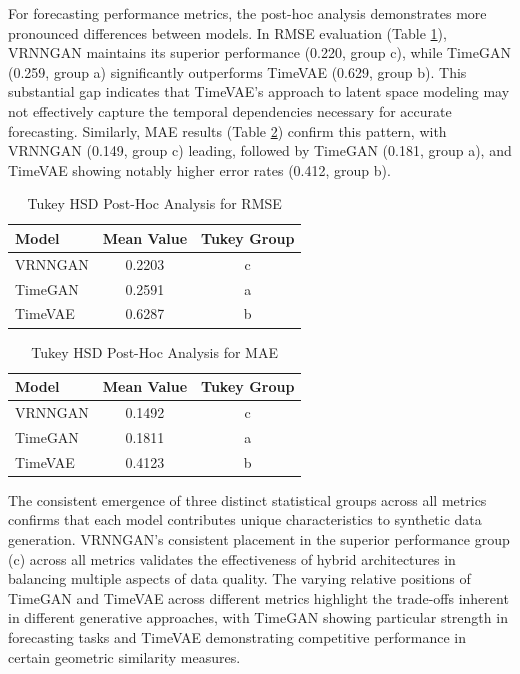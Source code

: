 \documentclass{article}
\begin{document}
For forecasting performance metrics, the post-hoc analysis demonstrates more pronounced differences between models. In RMSE evaluation (Table \ref{tab:tukey_rmse}), VRNNGAN maintains its superior performance (0.220, group c), while TimeGAN (0.259, group a) significantly outperforms TimeVAE (0.629, group b). This substantial gap indicates that TimeVAE's approach to latent space modeling may not effectively capture the temporal dependencies necessary for accurate forecasting. Similarly, MAE results (Table \ref{tab:tukey_mae}) confirm this pattern, with VRNNGAN (0.149, group c) leading, followed by TimeGAN (0.181, group a), and TimeVAE showing notably higher error rates (0.412, group b).


\begin{table}[H]
\centering
\caption{Tukey HSD Post-Hoc Analysis for RMSE}
\label{tab:tukey_rmse}
\begin{tabular}{lcc}
\toprule
\textbf{Model} & \textbf{Mean Value} & \textbf{Tukey Group} \\
\midrule
VRNNGAN & 0.2203 & c \\
TimeGAN & 0.2591 & a \\
TimeVAE & 0.6287 & b \\
\bottomrule
\end{tabular}
\footnotesize
\end{table}

\begin{table}[H]
\centering
\caption{Tukey HSD Post-Hoc Analysis for MAE}
\label{tab:tukey_mae}
\begin{tabular}{lcc}
\toprule
\textbf{Model} & \textbf{Mean Value} & \textbf{Tukey Group} \\
\midrule
VRNNGAN & 0.1492 & c \\
TimeGAN & 0.1811 & a \\
TimeVAE & 0.4123 & b \\
\bottomrule
\end{tabular}
\footnotesize
\end{table}

The consistent emergence of three distinct statistical groups across all metrics confirms that each model contributes unique characteristics to synthetic data generation. VRNNGAN's consistent placement in the superior performance group (c) across all metrics validates the effectiveness of hybrid architectures in balancing multiple aspects of data quality. The varying relative positions of TimeGAN and TimeVAE across different metrics highlight the trade-offs inherent in different generative approaches, with TimeGAN showing particular strength in forecasting tasks and TimeVAE demonstrating competitive performance in certain geometric similarity measures.
\end{document}
